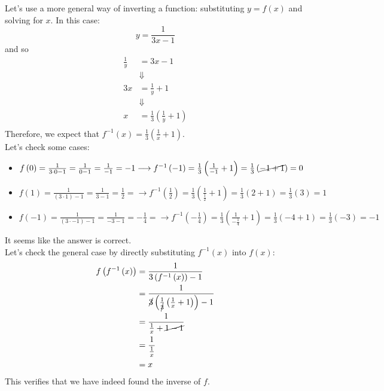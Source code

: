 \begin{enumerate}
{                \begin{answer}
                  Let's use a more general way of inverting a function: substituting $y=f\left( x \right)$ and solving for $x$. In this case:
                  \begin{equation*} 
                    y=\frac{1}{3x-1}
                  \end{equation*}
                  and so
                  \begin{align*} 
                    \frac{1}{y} &= 3x-1 \\
                    &\Downarrow \\
                    3x &= \frac{1}{y} + 1 \\
                    &\Downarrow \\
                    x &= \frac{1}{3}\left(\frac{1}{y} + 1\right) \\
                  \end{align*}
                  Therefore, we expect that $f^{-1}\left( x \right)=\frac{1}{3}\left( \frac{1}{x}+1 \right)$.\\
                  Let's check some cases:
                  \begin{itemize}
                    \item $f\left( 0 \right)=\frac{1}{3\cdot 0-1}=\frac{1}{0-1}=\frac{1}{-1}=-1 \longrightarrow f^{-1}\left( -1 \right)=\frac{1}{3}\left( \frac{1}{-1}+1 \right)=\frac{1}{3}\left( \cancel{-1+1} \right)=0$
                    \item $f\left( 1 \right)=\frac{1}{\left(3\cdot 1\right)-1}=\frac{1}{3-1}=\frac{1}{2}= \longrightarrow f^{-1}\left( \frac{1}{2} \right)=\frac{1}{3}\left( \frac{1}{\frac{1}{2}}+1\right)=\frac{1}{3}\left( 2+1 \right)=\frac{1}{3}\left( 3 \right)=1$
                    \item $f\left( -1 \right)=\frac{1}{\left(3\cdot -1\right)-1}=\frac{1}{-3-1}=-\frac{1}{4}= \longrightarrow f^{-1}\left( -\frac{1}{4} \right)=\frac{1}{3}\left( \frac{1}{-\frac{1}{4}}+1\right)=\frac{1}{3}\left( -4+1 \right)=\frac{1}{3}\left( -3 \right)=-1$
                  \end{itemize}
                  It seems like the answer is correct.\\
                  Let's check the general case by directly substituting $f^{-1}\left( x \right)$ into $f\left( x \right)$:
                  \begin{align*}
                    f \left( f^{-1}\left( x \right) \right) &= \frac{1}{3\left( f^{-1}\left( x \right) \right)-1} \\
                    &= \frac{1}{\cancel{3}\left( \frac{1}{\cancel{3}}\left( \frac{1}{x}+1 \right) \right)-1} \\
                    &= \frac{1}{\frac{1}{x}+\cancel{1-1}} \\
                    &= \frac{1}{\frac{1}{x}} \\
                    &= x
                  \end{align*}
                  This verifies that we have indeed found the inverse of $f$.
              \end{answer}}
            \fi


\end{enumerate}
